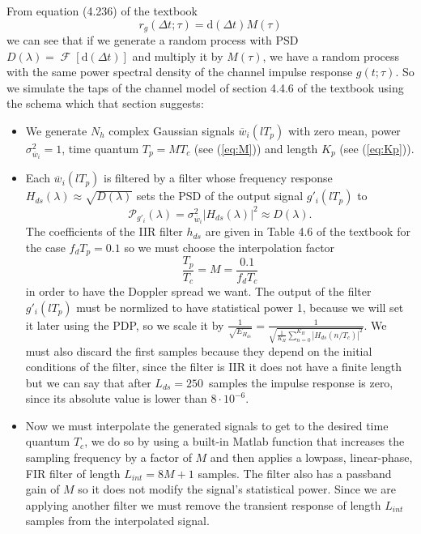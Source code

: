 \documentclass[a4paper,oneside]{article}
\newcommand{\abs}[1]{\left|#1\right|}
\newcommand{\F}[1]{\operatorname{\mathcal{F}}\left[#1\right]}
\begin{document}
From equation (4.236) of the textbook
\[ r_g(\Delta t;\tau) = \mathrm{d}(\Delta t)M(\tau) \]
we can see that if we generate a random process with PSD $D(\lambda) =
\F{\mathrm{d}(\Delta t)}$ and multiply it by $M(\tau)$, we have a
random process with the same power spectral density of the channel
impulse response $g(t;\tau)$. So we simulate the taps of the channel
model of section 4.4.6 of the textbook using the schema which that
section suggests:
\begin{itemize}
  \item We generate $N_h$ complex Gaussian signals
    $\overline{w}_i(lT_p)$ with zero mean, power
    $\sigma^2_{\overline{w}_i} = 1$, time quantum $T_p = MT_c$ (see
    (\ref{eq:M})) and length $K_p$ (see (\ref{eq:Kp})).
  \item Each $\overline{w}_i(lT_p)$ is filtered by a filter whose
    frequency response $ H_{ds}(\lambda) \approx \sqrt{D(\lambda)} $
    sets the PSD of the output signal $g'_i(lT_p)$ to
    \[ \mathcal{P}_{g'_i}(\lambda) = \sigma^2_{\overline{w}_i} \abs{H_{ds}(\lambda)}^2 \approx D(\lambda) . \]
    The coefficients of the IIR filter $h_{ds}$ are given in Table 4.6
    of the textbook for the case $f_dT_p = 0.1$ so we must choose the
    interpolation factor
    \begin{equation}
      \frac{T_p}{T_c} = M = \frac{0.1}{f_dT_c}
      \label{eq:M}
    \end{equation}
    in order to have the Doppler spread we want. The output of the
    filter $g'_i(lT_p)$ must be normlized to have statistical power 1,
    because we will set it later using the PDP, so we scale it by $
    \frac{1}{\sqrt{E_{H_{ds}}}} =
    \frac{1}{\sqrt{\frac{1}{K_H}\sum_{n=0}^{K_H}
        \abs{H_{ds}(n/T_c)}^2}} $. We must also discard the first
    samples because they depend on the initial conditions of the
    filter, since the filter is IIR it does not have a finite length
    but we can say that after $L_{ds} = 250$~samples the impulse
    response is zero, since its absolute value is lower than
    $8\cdot10^{-6}$.
    \item Now we must interpolate the generated signals to get to the
      desired time quantum $T_c$, we do so by using a built-in Matlab
      function that increases the sampling frequency by a factor of
      $M$ and then applies a lowpass, linear-phase, FIR filter of
      length $L_{int} = 8M+1$ samples. The filter also has a passband
      gain of $M$ so it does not modify the signal's statistical
      power. Since we are applying another filter we must remove the
      transient response of length $L_{int}$ samples from the
      interpolated signal.


\end{itemize}
\end{document}
